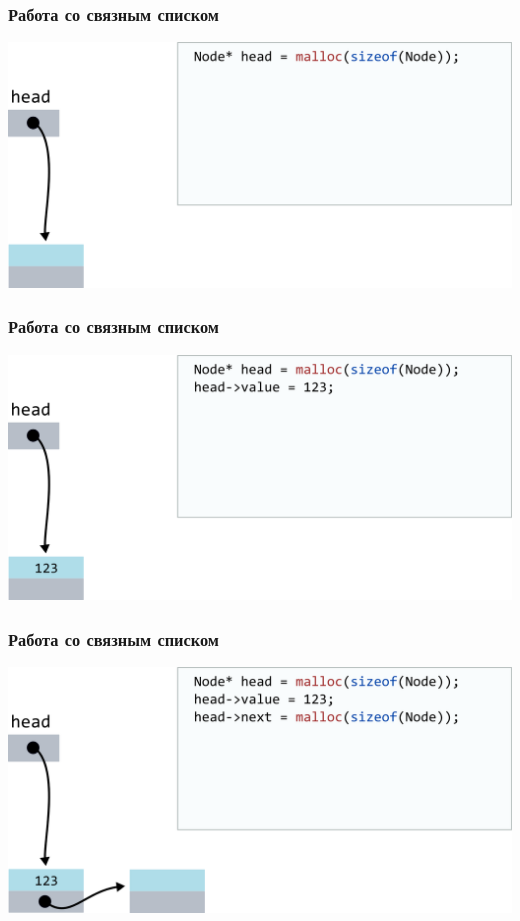 \documentclass[10pt,pdf,hyperref={unicode}]{beamer}
\begin{document}
\begin{frame}[fragile]
\frametitle{Работа со связным списком}
\begin{center}
\includegraphics[width=\imageSizeMult\linewidth]{../images/codelist/codelist2.png}
\end{center}
\end{frame}


\begin{frame}[fragile]
\frametitle{Работа со связным списком}
\begin{center}
\includegraphics[width=\imageSizeMult\linewidth]{../images/codelist/codelist3.png}
\end{center}
\end{frame}


\begin{frame}[fragile]
\frametitle{Работа со связным списком}
\begin{center}
\includegraphics[width=\imageSizeMult\linewidth]{../images/codelist/codelist4.png}
\end{center}
\end{frame}
\end{document}
